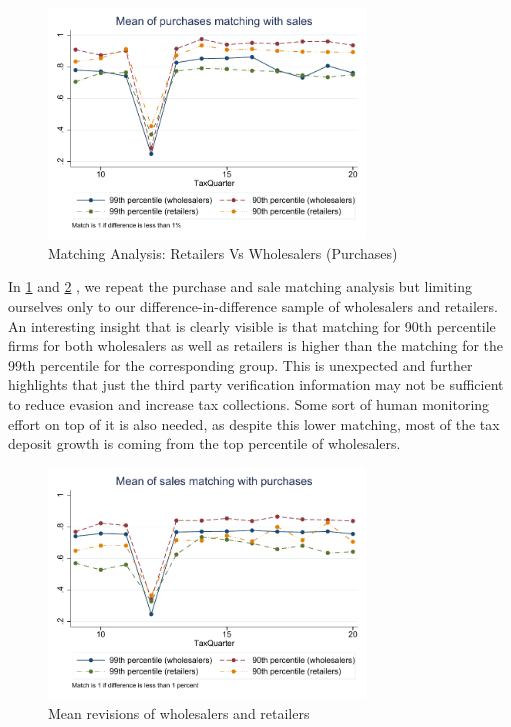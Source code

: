 \begin{figure}[H] 
\centering
\includegraphics[width=0.75\textwidth]{graphs/AvgMatch_trend_DiffLessThan1percent.pdf}
\caption{Matching Analysis: Retailers Vs Wholesalers (Purchases)}
\label{fig:matching_retailerswholesalers}
\end{figure}

In \cref{fig:matching_retailerswholesalers} and \cref{fig:matching_retailerswholesalers_sales} , we repeat the purchase and sale matching analysis but limiting ourselves only to our difference-in-difference sample of wholesalers and retailers. An interesting insight that is clearly visible is that matching for 90th percentile firms for both wholesalers as well as retailers is higher than the matching for the 99th percentile for the corresponding group. This is unexpected and further highlights that just the third party verification information may not be sufficient to reduce evasion and increase tax collections. Some sort of human monitoring effort on top of it is also needed, as despite this lower matching, most of the tax deposit growth is coming from the top percentile of wholesalers.

\begin{figure}[H] 
\centering
\includegraphics[width=0.75\textwidth]{graphs/SalesAvgMatch_trend_DiffLessThan1percent.pdf}
\caption{Mean revisions of wholesalers and retailers}
\label{fig:matching_retailerswholesalers_sales}
\end{figure}
\pagebreak

